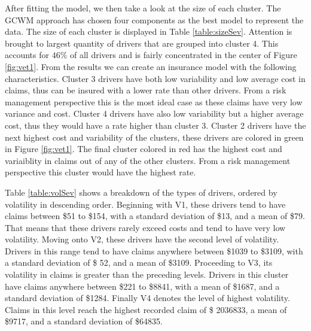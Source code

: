 \documentclass[11pt,letterpaper]{article}
\numberwithin{equation}{section}
\numberwithin{equation}{section}
\numberwithin{equation}{section}
\begin{document}
After fitting the model, we then take a look at the size of each cluster. The GCWM approach has chosen four components as the best model to represent the data. The size of each cluster is displayed in Table \ref{table:sizeSev}. Attention is brought to largest quantity  of drivers that are grouped into cluster 4. This accounts for $ 46 \% $ of all drivers and is fairly concentrated in the center of Figure \ref{fig:vet1}.
From the results we can create an insurance model with the following characteristics. Cluster 3 drivers have both low variability and low average cost in claims, thus can be insured with a lower rate than other drivers. From a risk management perspective this is the most ideal case as these claims have very low variance and cost. Cluster 4 drivers have also low variability but a higher average cost, thus they would have a rate higher than cluster 3. Cluster 2 drivers have the next highest cost and variability of the clusters, these drivers are colored in green in Figure \ref{fig:vet1}. The final cluster colored in red has the highest cost and variaiblity in claims out of any of the other clusters. From a risk management perspective this cluster would have the highest rate.
\begin{table}[!htb]
\centering
\caption{Summarized volatility information of each cluster for Claims.}
\label{table:volSev}
\end{table}



Table \ref{table:volSev} shows a breakdown of the types of drivers, ordered by volatility in descending order. Beginning with V1, these drivers tend to have claims between \$51 to \$154, with a standard deviation of \$13, and a mean of \$79. That means that these drivers rarely exceed costs and tend to have very low volatility. Moving onto V2, these drivers have the second level of volatility. Drivers in this range tend to have claims anywhere between \$1039 to \$3109, with a standard deviation of \$ 52, and a mean of \$3109.  Proceeding to V3, its volatility in claims is greater than the preceding levels. Drivers in this cluster have claims anywhere between \$221 to \$8841, with a mean of \$1687, and a standard deviation of \$1284. Finally V4 denotes the level of highest volatility. Claims in this level  reach the highest recorded claim of \$ 2036833, a mean of \$9717, and a standard deviation of \$64835.
\end{document}
